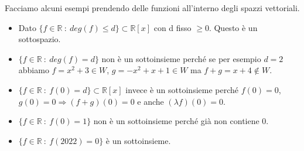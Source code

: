 \begin{example}
Facciamo alcuni esempi prendendo delle funzioni all'interno degli spazzi vettoriali.
\begin{itemize}
    \item Dato $\{f \in \mathbb{R} \: : \: deg(f) \leq d\} \subset \mathbb{R}[x]$ con d fisso $\geq 0$. Questo è un sottospazio.
    \item $\{f \in \mathbb{R} \: : \: deg(f) = d\}$ non è un sottoinsieme perché se per esempio $d=2$ abbiamo $f = x^2 + 3 \in W$, $g = -x^2 + x + 1 \in W$ ma $f + g = x + 4 \notin W$.
    \item $\{f \in \mathbb{R} \: : \: f(0) = d\} \subset \mathbb{R}[x]$ invece è un sottoinsieme perché $f(0) = 0$, $g(0)=0 \Longrightarrow (f + g)(0) = 0$ e anche $(\lambda f)(0) = 0$.
    \item $\{f \in \mathbb{R} \: : \: f(0) = 1\}$ non è un sottoinsieme perché già non contiene 0.
    \item $\{f \in \mathbb{R} \: : \: f(2022) = 0\}$ è un sottoinsieme.
\end{itemize}
\end{example}
\newpage
